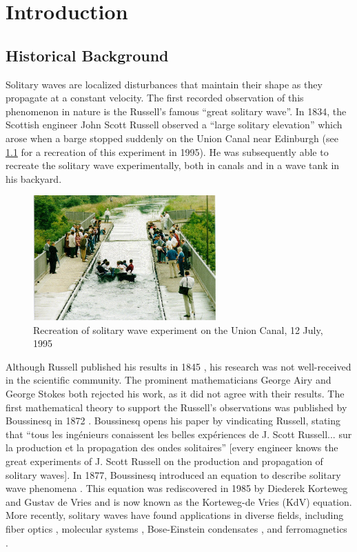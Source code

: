 \documentclass[thesis.tex]{subfiles}
\begin{document}
\iffulldocument\else
	\chapter{Introduction}
\fi

\section{Historical Background}

Solitary waves are localized disturbances that maintain their shape as they propagate at a constant velocity. The first recorded observation of this phenomenon in nature is the Russell's famous ``great solitary wave''. In 1834, the Scottish engineer John Scott Russell observed a ``large solitary elevation'' which arose when a barge stopped suddenly on the Union Canal near Edinburgh (see \cref{fig:canalwave} for a recreation of this experiment in 1995). He was subsequently able to recreate the solitary wave experimentally, both in canals and in a wave tank in his backyard.  
\begin{figure}
\begin{center}
\includegraphics[width=7cm]{images/intro/solitonHW.jpg}
\caption{Recreation of solitary wave experiment on the Union Canal, 12 July, 1995 \cite{Nature1995} }
\label{fig:canalwave}
\end{center}
\end{figure}

Although Russell published his results in 1845 \cite{russell1845}, his research was not well-received in the scientific community. The prominent mathematicians George Airy and George Stokes both rejected his work, as it did not agree with their results. The first mathematical theory to support the Russell's observations was published by Boussinesq in 1872 \cite{Boussinesq1872}. Boussinesq opens his paper by vindicating Russell, stating that ``tous les ing{\'e}nieurs conaissent les belles exp{\'e}riences de J. Scott Russell... sur la production et la propagation des ondes solitaires'' [every engineer knows the great experiments of J. Scott Russell on the production and propagation of solitary waves]. In 1877, Boussinesq introduced an equation to describe solitary wave phenomena \cite{boussinesq1877essai}. This equation was rediscovered in 1985 by Diederek Korteweg and Gustav de Vries \cite{KdVoriginal} and is now known as the Korteweg-de Vries (KdV) equation. More recently, solitary waves have found applications in diverse fields, including fiber optics \cite{Taylor1992}, molecular systems \cite{Davydov1985}, Bose-Einstein condensates \cite{Panos2008BEC}, and ferromagnetics \cite{Kosevich1998}.
\end{document}
